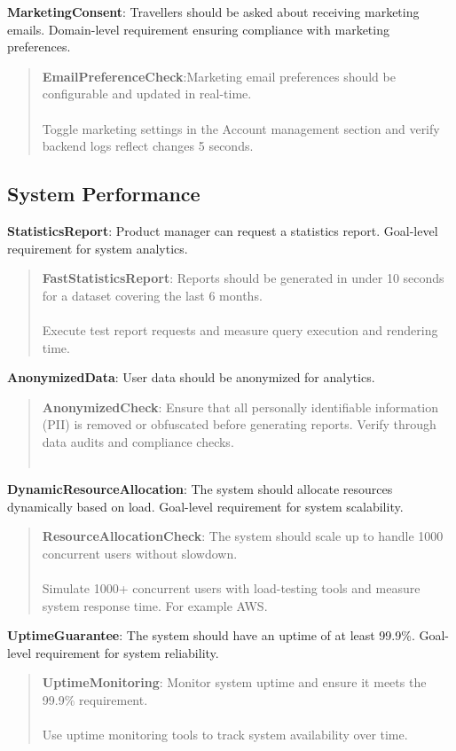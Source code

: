 \textbf{MarketingConsent}: Travellers should be asked about receiving marketing emails. Domain-level requirement ensuring compliance with marketing preferences.
\begin{quote}
    \textbf{EmailPreferenceCheck}:Marketing email preferences should be configurable and updated in real-time. \\ \\ 
    Toggle marketing settings in the Account management section and verify backend logs reflect changes 5 seconds.
\end{quote}

\subsection{System Performance}
\textbf{StatisticsReport}: Product manager can request a statistics report. Goal-level requirement for system analytics.
\begin{quote}
    \textbf{FastStatisticsReport}: Reports should be generated in under 10 seconds for a dataset covering the last 6 months. \\ \\
    Execute test report requests and measure query execution and rendering time.
\end{quote}
\textbf{AnonymizedData}: User data should be anonymized for analytics. 
\begin{quote}
    \textbf{AnonymizedCheck}: Ensure that all personally identifiable information (PII) is removed or obfuscated before generating reports. Verify through data audits and compliance checks. \\ \\
\end{quote}
\textbf{DynamicResourceAllocation}: The system should allocate resources dynamically based on load. Goal-level requirement for system scalability.
\begin{quote}
    \textbf{ResourceAllocationCheck}: The system should scale up to handle 1000 concurrent users without slowdown. \\ \\
    Simulate 1000+ concurrent users with load-testing tools and measure system response time. For example AWS.
\end{quote}
\textbf{UptimeGuarantee}: The system should have an uptime of at least 99.9\%. Goal-level requirement for system reliability.
\begin{quote}
    \textbf{UptimeMonitoring}: Monitor system uptime and ensure it meets the 99.9\% requirement. \\ \\
    Use uptime monitoring tools to track system availability over time.
\end{quote}
